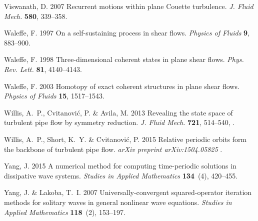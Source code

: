 \documentclass{article}
\begin{document}
\begin{thebibliography}{68}
{\sc Viswanath, D.} 2007 Recurrent motions within plane {C}ouette turbulence.
  {\em J. Fluid Mech.\/} {\bf 580}, 339--358.

{\sc Waleffe, F.} 1997 On a self-sustaining process in shear flows. {\em
  Physics of Fluids\/} {\bf 9}, 883--900.

{\sc Waleffe, F.} 1998 Three-dimensional coherent states in plane shear flows.
  {\em Phys. Rev. Lett.\/} {\bf 81}, 4140--4143.

{\sc Waleffe, F.} 2003 Homotopy of exact coherent structures in plane shear
  flows. {\em Physics of Fluids\/} {\bf 15}, 1517--1543.

{\sc Willis, A.~P., Cvitanovi{\'c}, P. \& Avila, M.} 2013 Revealing the state
  space of turbulent pipe flow by symmetry reduction. {\em J. Fluid Mech.\/}
  {\bf 721}, 514--540, .

{\sc Willis, A.~P., Short, K.~Y. \& Cvitanovi{\'c}, P.} 2015 Relative periodic
  orbits form the backbone of turbulent pipe flow. {\em arXiv preprint
  arXiv:1504.05825\/} .

{\sc Yang, J.} 2015 A numerical method for computing time-periodic solutions in
  dissipative wave systems. {\em Studies in Applied Mathematics\/} {\bf
  134}~(4), 420--455.

{\sc Yang, J. \& Lakoba, T.~I.} 2007 Universally-convergent squared-operator
  iteration methods for solitary waves in general nonlinear wave equations.
  {\em Studies in Applied Mathematics\/} {\bf 118}~(2), 153--197.

\end{thebibliography}



\end{document}
